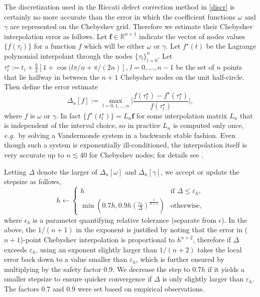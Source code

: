 \documentclass[10pt]{article}
\newcommand{\be}{\begin{equation}}
\newcommand{\ee}{\end{equation}}
\newcommand{\eg}{{\it e.g.\ }}
\newcommand{\mbf}[1]{{\mathbf #1}}
\newcommand{\R}{\mathbb{R}}
\newcommand{\eps}{\epsilon}
\newcommand{\om}{\omega}
\newcommand{\g}{\gamma}
\begin{document}
The discretization used in the Riccati defect correction method in \cref{discr} is certainly no more accurate than
the error in which the coefficient functions $\om$ and $\g$ are represented
on the Chebyshev grid.
Therefore we estimate their Chebyshev interpolation error as follows.
Let $\mbf{f}\in\R^{n+1}$ indicate the vector of nodes values
$\{f(\tau_l)\}$ for a function $f$ which will be either $\om$ or $\g$.
Let $f^\star(t)$ be the Lagrange polynomial interpolant through the
nodes $\{\tau_l\}_{l=0}^n$.
Let $\tau^\star_l := t_i + \tfrac{h}{2}[1 + \cos(l\pi/n + \pi/(2n)]$, $l=0,\dots,n-1$ be the set of $n$ points that lie halfway in between the $n+1$ Chebyshev nodes on the unit half-circle.
Then define the error estimate
\be
    \Delta_n[f] := \max_{l = 0, 1, \ldots, n} \biggl| \frac{f(\tau^{\star}_l) -
    f^{\star}(\tau^{\star}_l)}{f(\tau^{\star}_l)} \biggr|,
\ee
where $f$ is $\om$ or $\g$.
In fact $\{f^{\star}(t^{\star}_l)\} = L_n \mbf{f}$ for some interpolation matrix
$L_n$ that is independent of the interval choice, so in practice
$L_n$ is computed only once, \eg by solving a Vandermonde system in a backwards
stable fashion.
Even though such a system is exponentially ill-conditioned,
the interpolation itself is very accurate up to $n \lesssim 40$
for Chebyshev nodes; for details see
\cite[Appendix A]{helsing_close}.

Letting $\Delta$ denote the larger of $\Delta_n[\om]$ and $\Delta_n[\g]$, we accept or update the stepsize as follows,
\be
    h \leftarrow \begin{cases}
        h &\text{if } \Delta \leq \varepsilon_h, \\
        \min \left( 0.7h, 0.9 h \left( \frac{\varepsilon_h}{\Delta} \right)^{\frac{1}{n+1}} \right) &\text{otherwise},
    \end{cases}
    \ee
where $\eps_h$ is a parameter quantifying relative tolerance (separate from $\eps$). In the above, the $1/(n+1)$ in the exponent is justified by noting that the
error in ($n+1$)-point Chebyshev interpolation is proportional to $h^{n+2}$, therefore if
$\Delta$ exceeds $\varepsilon_h$, using an exponent slightly larger than $1/(n+2)$ takes
the local error back down to a value smaller than $\varepsilon_h$, which is further
ensured by multiplying by the safety factor 0.9. We decrease the step to $0.7h$
if it yields a smaller stepsize to ensure quicker convergence if $\Delta$ is
only slightly larger than $\varepsilon_h$. The factors 0.7 and 0.9 were set based on
empirical observations. 
\end{document}
